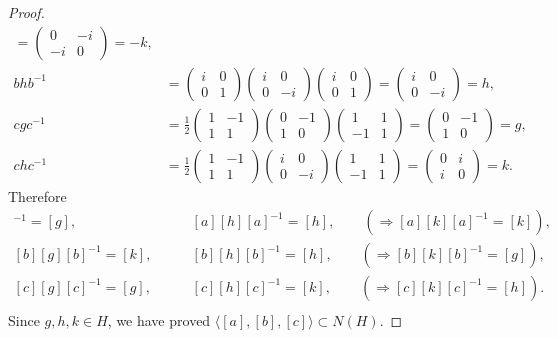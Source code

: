 \documentclass[11pt,a4paper]{article}
\begin{document}
{\begin{proof}
\begin{align*}
= \begin{pmatrix} 0 & -i\\-i & 0 \end{pmatrix} =  -k,\\
bhb^{-1} &= \begin{pmatrix} i & 0\\0 & 1 \end{pmatrix} \begin{pmatrix} i & 0 \\0 & -i \end{pmatrix}   \begin{pmatrix} i & 0\\0 & 1 \end{pmatrix}
=  \begin{pmatrix} i & 0 \\0 & -i \end{pmatrix} = h,\\
cgc^{-1} &=\frac{1}{2} \begin{pmatrix} 1 & -1\\1 & 1 \end{pmatrix}  \begin{pmatrix} 0 & -1\\1 & 0 \end{pmatrix}\begin{pmatrix} 1 & 1\\-1 & 1 \end{pmatrix}
=\begin{pmatrix} 0 & -1\\1 & 0 \end{pmatrix} = g,\\
chc^{-1} &=\frac{1}{2} \begin{pmatrix} 1 & -1\\1 & 1 \end{pmatrix}  \begin{pmatrix} i & 0 \\0 & -i \end{pmatrix}\begin{pmatrix} 1 & 1\\-1 & 1 \end{pmatrix}
=\begin{pmatrix} 0& i \\i & 0 \end{pmatrix}  = k.
\end{align*}
Therefore
\begin{align*}
[a][g][a]^{-1} = [g], \qquad &[a][h][a]^{-1} = [h],\qquad  ( \Rightarrow [a][k][a]^{-1} = [k]),\\
[b][g][b]^{-1} = [k], \qquad &[b][h][b]^{-1} = [h],\qquad  ( \Rightarrow [b][k][b]^{-1} = [g]),\\  
[c][g][c]^{-1} = [g], \qquad &[c][h][c]^{-1} = [k],\qquad  ( \Rightarrow [c][k][c]^{-1} = [h]).\\
\end{align*}
Since $g,h,k \in H$, we have proved $\langle[a],[b],[c]\rangle \subset N(H)$.


\end{proof}}
\end{document}
